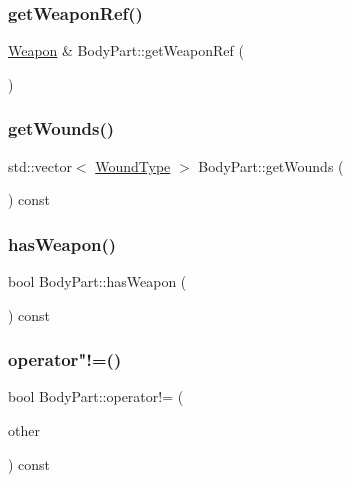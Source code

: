 \mbox{\label{class_body_part_a65b38899cd3805bc1e52253f971c5978}} 
\subsubsection{\texorpdfstring{get\+Weapon\+Ref()}{getWeaponRef()}}
{\footnotesize\ttfamily \mbox{\hyperlink{class_weapon}{Weapon}} \& Body\+Part\+::get\+Weapon\+Ref (\begin{DoxyParamCaption}{ }\end{DoxyParamCaption})}

\mbox{\label{class_body_part_a14b7007a9ddb15b7e3f5c6881dbf69d5}} 
\subsubsection{\texorpdfstring{get\+Wounds()}{getWounds()}}
{\footnotesize\ttfamily std\+::vector$<$ \mbox{\hyperlink{_enum_types_8hpp_a585daaeecd1f9f1350c24bf0081a734e}{Wound\+Type}} $>$ Body\+Part\+::get\+Wounds (\begin{DoxyParamCaption}{ }\end{DoxyParamCaption}) const}

\mbox{\label{class_body_part_aeaa4e41c77eb72031f6482ed4d7e5919}} 
\subsubsection{\texorpdfstring{has\+Weapon()}{hasWeapon()}}
{\footnotesize\ttfamily bool Body\+Part\+::has\+Weapon (\begin{DoxyParamCaption}{ }\end{DoxyParamCaption}) const}

\mbox{\label{class_body_part_aa5df801cc11333d0adeaa5235c70bc7c}} 
\subsubsection{\texorpdfstring{operator"!=()}{operator!=()}}
{\footnotesize\ttfamily bool Body\+Part\+::operator!= (\begin{DoxyParamCaption}\item[{\mbox{\hyperlink{class_body_part}{Body\+Part}} \&}]{other }\end{DoxyParamCaption}) const}

